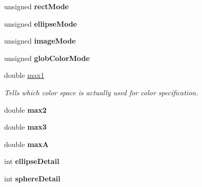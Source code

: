 \begin{DoxyCompactItemize}
\item 
\hypertarget{classcprocessing_1_1Style_ad6c53e0b11b150ce9b0d4cda838b21a0}{unsigned {\bfseries rect\-Mode}}\label{classcprocessing_1_1Style_ad6c53e0b11b150ce9b0d4cda838b21a0}

\item 
\hypertarget{classcprocessing_1_1Style_ac45b66048241d2ecd1cc45f3d33ee1a9}{unsigned {\bfseries ellipse\-Mode}}\label{classcprocessing_1_1Style_ac45b66048241d2ecd1cc45f3d33ee1a9}

\item 
\hypertarget{classcprocessing_1_1Style_ac8e0290066dbe7b14333e8b263d1f3b2}{unsigned {\bfseries image\-Mode}}\label{classcprocessing_1_1Style_ac8e0290066dbe7b14333e8b263d1f3b2}

\item 
\hypertarget{classcprocessing_1_1Style_a03938147fd7720cb4e3370db07840770}{unsigned {\bfseries glob\-Color\-Mode}}\label{classcprocessing_1_1Style_a03938147fd7720cb4e3370db07840770}

\item 
double \hyperlink{classcprocessing_1_1Style_a7eec2077d120edee546ef5c396bd76b4}{max1}
\begin{DoxyCompactList}\small\item\em \-Tells which color space is actually used for color specification. \end{DoxyCompactList}\item 
\hypertarget{classcprocessing_1_1Style_ab398d4a05ab2a554d5856f6394a3908c}{double {\bfseries max2}}\label{classcprocessing_1_1Style_ab398d4a05ab2a554d5856f6394a3908c}

\item 
\hypertarget{classcprocessing_1_1Style_addd5a8e8c0b252f452a0a20f37db4976}{double {\bfseries max3}}\label{classcprocessing_1_1Style_addd5a8e8c0b252f452a0a20f37db4976}

\item 
\hypertarget{classcprocessing_1_1Style_a6c84aee2964e963e5d4a398fecb6820e}{double {\bfseries max\-A}}\label{classcprocessing_1_1Style_a6c84aee2964e963e5d4a398fecb6820e}

\item 
\hypertarget{classcprocessing_1_1Style_ab57be3369f09dda4193bd28665776155}{int {\bfseries ellipse\-Detail}}\label{classcprocessing_1_1Style_ab57be3369f09dda4193bd28665776155}

\item 
\hypertarget{classcprocessing_1_1Style_ae4228a0d8904da20016816b72773722e}{int {\bfseries sphere\-Detail}}\label{classcprocessing_1_1Style_ae4228a0d8904da20016816b72773722e}


\end{DoxyCompactItemize}

